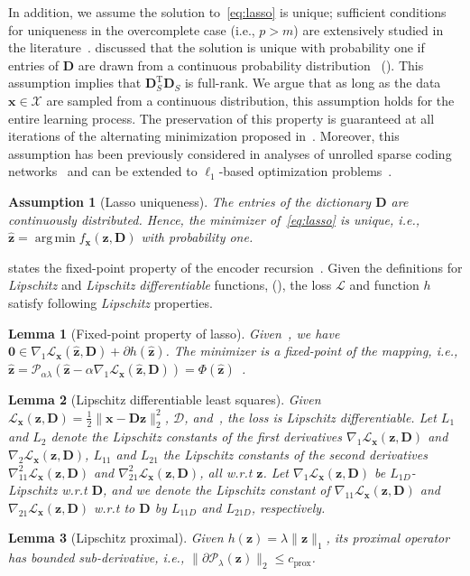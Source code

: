 \documentclass[10pt]{article} %
\newtheorem{lemma}{Lemma}[section]
\newtheorem{assumption}{Assumption}[section]
\newcommand{\D}{{\bm D}}
\newcommand{\x}{{\bm x}}
\newcommand{\z}{{\bm z}}
\newcommand{\zero}{{\bm 0}}
\newcommand{\Loss}{\mathcal{L}}
\newcommand{\X}{\mathcal{X}}
\newcommand{\Dcal}{\mathcal{D}}
\newcommand{\prox}{\mathcal{P}}
\DeclareMathOperator*{\argmin}{arg\,min}
\begin{document}
In addition, we assume the solution to~\eqref{eq:lasso} is unique; sufficient conditions for uniqueness in the overcomplete case (i.e., $p > m$) are extensively studied in the literature~\citep{wainwright2009sharp, candes2009l1, tibshirani2012lassounique}. \citet{tibshirani2012lassounique} discussed that the solution is unique with probability one if entries of $\D$ are drawn from a continuous probability distribution~\citep{tibshirani2012lassounique} (). This assumption implies that $\D^{\text{T}}_S \D_S$ is full-rank. We argue that as long as the data $\x \in \X$ are sampled from a continuous distribution, this assumption holds for the entire learning process. The preservation of this property is guaranteed at all iterations of the alternating minimization proposed in~\citep{agarwal2014overdl}. Moreover, this assumption has been previously considered in analyses of unrolled sparse coding networks~\citep{ablin2019stepsize, malezieux2022understanding} and can be extended to $\ell_1$-based optimization problems~\citep{ tibshirani2012lassounique, rosset2004boosting}. 
%
\begin{assumption}[Lasso uniqueness]\label{assum:unique}
The entries of the dictionary $\D$ are continuously distributed. Hence, the minimizer of~\eqref{eq:lasso} is unique, i.e., $\hat \z = \argmin f_{\x}(\z, \D)$ with probability one.
\end{assumption}
%
 states the fixed-point property of the encoder recursion~\citep{parikh2014proximal}. Given the definitions for {\it Lipschitz} and {\it Lipschitz differentiable} functions, (), the loss $\Loss$ and function $h$ satisfy following {\it Lipschitz} properties.
%
\begin{lemma}[Fixed-point property of lasso]\label{lemma:fixedpoint}
Given~, we have $\zero \in \nabla_1 \Loss_{\x}(\hat \z, \D) + \partial h(\hat \z)$. The minimizer is a fixed-point of the mapping, i.e., $\hat \z = \prox_{\alpha \lambda}(\hat \z - \alpha \nabla_1 \Loss_{\x}(\hat \z, \D)) = \Phi(\hat \z)$~\citep{parikh2014proximal}.
\end{lemma}
%
\begin{lemma}[Lipschitz differentiable least squares]\label{lemma:lipdiffloss}
Given $\Loss_{\x}(\z, \D) = \frac{1}{2} \| \x - \D \z \|_2^2$, $\Dcal$, and~, the loss is Lipschitz differentiable. Let $L_1$ and $L_2$ denote the Lipschitz constants of the first derivatives $\nabla_1\Loss_{\x}(\z, \D)$ and $\nabla_2\Loss_{\x}(\z, \D)$, $L_{11}$ and $L_{21}$ the Lipschitz constants of the second derivatives $\nabla_{11}^2\Loss_{\x}(\z, \D)$ and $\nabla_{21}^2\Loss_{\x}(\z, \D)$, all w.r.t $\z$. Let $\nabla_1\Loss_{\x}(\z, \D)$ be $L_{1D}$-Lipschitz w.r.t $\D$, and we denote the Lipschitz constant of $\nabla_{11}\Loss_{\x}(\z, \D)$ and $\nabla_{21}\Loss_{\x}(\z, \D)$ w.r.t to $\D$ by $L_{11D}$ and $L_{21D}$, respectively.
\end{lemma}
%
\begin{lemma}[Lipschitz proximal]\label{lemma:lipprox}
Given $h(\z) = \lambda \| \z \|_1$, its proximal operator has bounded sub-derivative, i.e., $\| \partial \prox_{\lambda}(\z) \|_2 \leq c_{\text{prox}}$.
\end{lemma}
%
\end{document}
